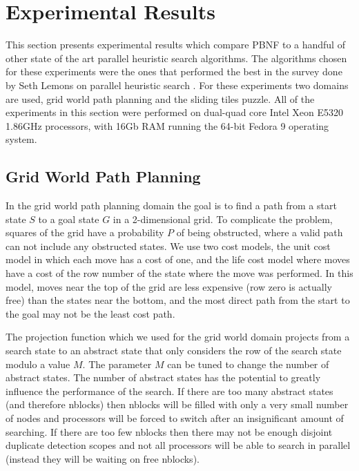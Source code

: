 \documentclass{article}
\begin{document}
\section{Experimental Results}

This section presents experimental results which compare PBNF to a
handful of other state of the art parallel heuristic search
algorithms.  The algorithms chosen for these experiments were the ones
that performed the best in the survey done by Seth Lemons on parallel
heuristic search \cite{lemons:sur}.  For these experiments two domains
are used, grid world path planning and the sliding tiles puzzle.  All
of the experiments in this section were performed on dual-quad core
Intel Xeon E5320 1.86GHz processors, with 16Gb RAM running the 64-bit
Fedora 9 operating system.


\subsection{Grid World Path Planning}

In the grid world path planning domain the goal is to find a path from
a start state $S$ to a goal state $G$ in a 2-dimensional grid.  To
complicate the problem, squares of the grid have a probability $P$ of
being obstructed, where a valid path can not include any obstructed
states.  We use two cost models, the unit cost model in which each
move has a cost of one, and the life cost model where moves have a
cost of the row number of the state where the move was performed.  In
this model, moves near the top of the grid are less expensive (row
zero is actually free) than the states near the bottom, and the most
direct path from the start to the goal may not be the least cost path.

The projection function which we used for the grid world domain
projects from a search state to an abstract state that only considers
the row of the search state modulo a value $M$.  The parameter $M$ can
be tuned to change the number of abstract states.  The number of
abstract states has the potential to greatly influence the performance
of the search.  If there are too many abstract states (and therefore
nblocks) then nblocks will be filled with only a very small number of
nodes and processors will be forced to switch after an insignificant
amount of searching.  If there are too few nblocks then there may not
be enough disjoint duplicate detection scopes and not all processors
will be able to search in parallel (instead they will be waiting on
free nblocks).
\end{document}
